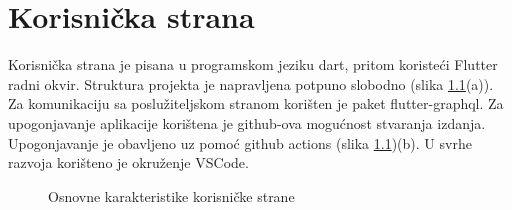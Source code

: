 \documentclass[times, utf8, zavrsni]{fer}
\begin{document}
\chapter{Korisnička strana}
Korisnička strana je pisana u programskom jeziku dart, pritom koristeći
Flutter radni okvir. Struktura projekta je napravljena potpuno slobodno (slika \ref{fig:Frontend}(a)).
Za komunikaciju sa poslužiteljskom stranom korišten je paket flutter-graphql.
Za upogonjavanje aplikacije korištena je github-ova mogućnost
stvaranja izdanja. Upogonjavanje je obavljeno uz pomoć github actions (slika \ref{fig:Frontend})(b).
U svrhe razvoja korišteno je okruženje VSCode.
\begin{figure}[h]
      \centering
      \caption{Osnovne karakteristike korisničke strane}
      \label{fig:Frontend}
\end{figure}
\end{document}
